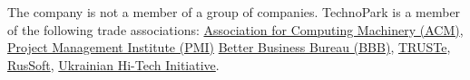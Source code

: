 The company is not a member of a group of companies.
TechnoPark is a member of the following trade associations:
    \href{http://www.acm.org}{Association for Computing Machinery (ACM)},
    \href{http://www.pmi.org}{Project Management Institute (PMI)}
	\href{https://www.bbb.org/online/consumer/cks.aspx?ID=10805219819}{Better Business Bureau (BBB)},
	\href{http://www.truste.org/ivalidate.php?url=www.technoparkcorp.com&amp;sealid=101}{TRUSTe},
	\href{http://www.russoft.org}{RusSoft},
	\href{http://hi-tech.org.ua/Russian/about/members/index.html}{Ukrainian Hi-Tech Initiative}.
